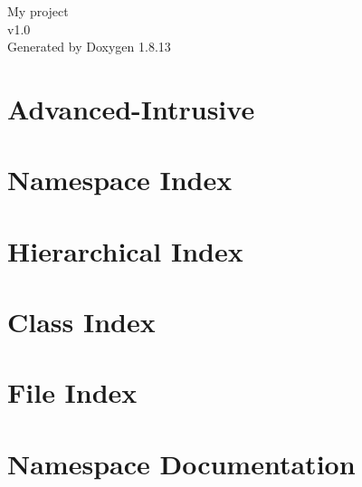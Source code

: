 \documentclass[twoside]{book}
\newcommand{\+}{\discretionary{\mbox{\scriptsize$\hookleftarrow$}}{}{}}
\newcommand{\clearemptydoublepage}{%
  \newpage{\pagestyle{empty}\cleardoublepage}%
}
\begin{document}
\hypersetup{pageanchor=false,
             bookmarksnumbered=true,
             pdfencoding=unicode
            }
\begin{titlepage}
\vspace*{7cm}
\begin{center}%
{\Large My project \\[1ex]\large v1.\+0 }\\
\vspace*{1cm}
{\large Generated by Doxygen 1.8.13}\\
\end{center}
\end{titlepage}
\clearemptydoublepage
{}
\tableofcontents
\clearemptydoublepage
{}
\hypersetup{pageanchor=true}

\chapter{Advanced-\/\+Intrusive}
\label{md__home_hari_GSOC_boost_1_67_0_boost_Advanced-Intrusive-master_README}

\chapter{Namespace Index}

\chapter{Hierarchical Index}

\chapter{Class Index}

\chapter{File Index}

\chapter{Namespace Documentation}


\end{document}
